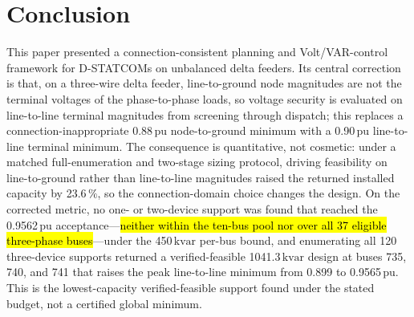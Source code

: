 \documentclass{ieeeaccess}
\newcommand{\rev}[1]{{\color{red}\hl{#1}}}
\newcommand{\rev}[1]{#1}
\providecommand{\percent}{\%}
\newcommand{\num}[1]{#1}
\newcommand{\SI}[2]{#1\,\ensuremath{\mathrm{#2}}}
\newcommand{\kvar}{\text{kvar}}
\begin{document}
\section{Conclusion}
\label{sec:conclusion}
This paper presented a connection-consistent planning and Volt/VAR-control framework
for D-STATCOMs on unbalanced delta feeders. Its central correction is that, on a
three-wire delta feeder, line-to-ground node magnitudes are not the terminal
voltages of the phase-to-phase loads, so voltage security is evaluated on
line-to-line terminal magnitudes from screening through dispatch; this replaces a
connection-inappropriate \SI{0.88}{pu} node-to-ground minimum with a \SI{0.90}{pu}
line-to-line terminal minimum. The consequence is quantitative, not cosmetic: under a
matched full-enumeration and two-stage sizing protocol, driving feasibility on
line-to-ground rather than line-to-line magnitudes raised the returned installed
capacity by \SI{23.6}{\percent}, so the connection-domain choice changes the design.
On the corrected metric, no one- or two-device support was found that reached the \SI{0.9562}{pu}
acceptance---\rev{neither within the ten-bus pool nor over all \mbox{\num{37}}
eligible three-phase buses}---under the \SI{450}{\kvar} per-bus bound, and enumerating
all 120 three-device supports returned a verified-feasible \SI{1041.3}{\kvar} design
at buses 735, 740, and 741 that raises the peak line-to-line minimum from \num{0.899}
to \SI{0.9565}{pu}. This is the lowest-capacity verified-feasible support found under
the stated budget, not a certified global minimum.
\end{document}
